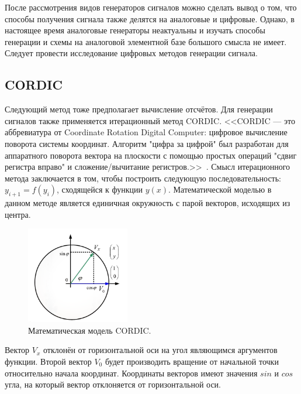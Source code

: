 	После рассмотрения видов генераторов сигналов можно сделать вывод о том, что способы получения сигнала также делятся на аналоговые и цифровые. Однако, в настоящее время аналоговые генераторы неактуальны и изучать способы генерации и схемы на аналоговой элементной базе большого смысла не имеет. Следует провести исследование цифровых методов генерации сигнала. 
	
\subsection*{CORDIC}
	Следующий метод тоже предполагает вычисление отсчётов. Для генерации сигналов также применяется итерационный метод CORDIC. <<CORDIC --- это аббревиатура от Coordinate Rotation Digital Computer: цифровое вычисление поворота системы координат. Алгоритм "цифра за цифрой" был разработан для аппаратного поворота вектора на плоскости с помощью простых операций "сдвиг регистра вправо" и сложение/вычитание регистров.>>~\cite{cordic}. Смысл итерационного метода заключается в том, чтобы построить следующую последовательность: $y_{i+1}=f(y_{i})$, сходящейся к функции $y(x)$. Математической моделью в данном методе является единичная окружность с парой векторов, исходящих из центра.
	
	\begin{figure}[H]
    \centering
    \includegraphics[width=0.4\textwidth]{../image/cordic.png}
    \caption{Математическая модель CORDIC.}
	\end{figure}

Вектор $V_{x}$ отклонён от горизонтальной оси на угол являющимся аргументов функции. Второй вектор $V_{0}$ будет производить вращение от начальной точки относительно начала координат. Координаты векторов имеют значения $sin$ и $cos$ угла, на который вектор отклоняется от горизонтальной оси. 

